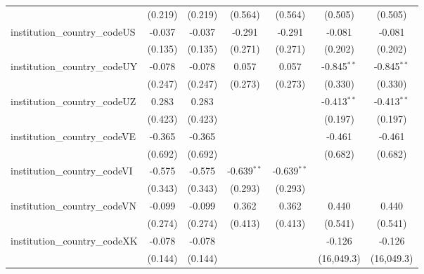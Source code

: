 \begin{tabular}{lcccccc}
                                         & (0.219)        & (0.219)        & (0.564)        & (0.564)        & (0.505)        & (0.505)\\   
   institution\_country\_codeUS          & -0.037         & -0.037         & -0.291         & -0.291         & -0.081         & -0.081\\   
                                         & (0.135)        & (0.135)        & (0.271)        & (0.271)        & (0.202)        & (0.202)\\   
   institution\_country\_codeUY          & -0.078         & -0.078         & 0.057          & 0.057          & -0.845$^{**}$  & -0.845$^{**}$\\   
                                         & (0.247)        & (0.247)        & (0.273)        & (0.273)        & (0.330)        & (0.330)\\   
   institution\_country\_codeUZ          & 0.283          & 0.283          &                &                & -0.413$^{**}$  & -0.413$^{**}$\\   
                                         & (0.423)        & (0.423)        &                &                & (0.197)        & (0.197)\\   
   institution\_country\_codeVE          & -0.365         & -0.365         &                &                & -0.461         & -0.461\\   
                                         & (0.692)        & (0.692)        &                &                & (0.682)        & (0.682)\\   
   institution\_country\_codeVI          & -0.575         & -0.575         & -0.639$^{**}$  & -0.639$^{**}$  &                &   \\   
                                         & (0.343)        & (0.343)        & (0.293)        & (0.293)        &                &   \\   
   institution\_country\_codeVN          & -0.099         & -0.099         & 0.362          & 0.362          & 0.440          & 0.440\\   
                                         & (0.274)        & (0.274)        & (0.413)        & (0.413)        & (0.541)        & (0.541)\\   
   institution\_country\_codeXK          & -0.078         & -0.078         &                &                & -0.126         & -0.126\\   
                                         & (0.144)        & (0.144)        &                &                & (16,049.3)     & (16,049.3)\\   

\end{tabular}

